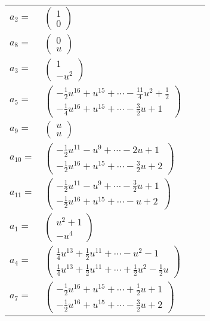 \documentclass[1p]{elsarticle_modified}
\theoremstyle{definition}
\begin{document}
\begin{tabular}{m{7pt} m{180pt} m{7pt} m{180pt} }
\flushright $a_{2}=$&$\begin{pmatrix}1\\0\end{pmatrix}$ \\
\flushright $a_{8}=$&$\begin{pmatrix}0\\u\end{pmatrix}$ \\
\flushright $a_{3}=$&$\begin{pmatrix}1\\- u^2\end{pmatrix}$ \\
\flushright $a_{5}=$&$\begin{pmatrix}-\frac{1}{2} u^{16}+u^{15}+\cdots-\frac{11}{4} u^2+\frac{1}{2}\\-\frac{1}{4} u^{16}+u^{15}+\cdots-\frac{3}{2} u+1\end{pmatrix}$ \\
\flushright $a_{9}=$&$\begin{pmatrix}u\\u\end{pmatrix}$ \\
\flushright $a_{10}=$&$\begin{pmatrix}-\frac{1}{2} u^{11}- u^9+\cdots-2 u+1\\-\frac{1}{2} u^{16}+u^{15}+\cdots-\frac{3}{2} u+2\end{pmatrix}$ \\
\flushright $a_{11}=$&$\begin{pmatrix}-\frac{1}{2} u^{11}- u^9+\cdots-\frac{3}{2} u+1\\-\frac{1}{2} u^{16}+u^{15}+\cdots- u+2\end{pmatrix}$ \\
\flushright $a_{1}=$&$\begin{pmatrix}u^2+1\\- u^4\end{pmatrix}$ \\
\flushright $a_{4}=$&$\begin{pmatrix}\frac{1}{4} u^{13}+\frac{1}{2} u^{11}+\cdots- u^2-1\\\frac{1}{4} u^{13}+\frac{1}{2} u^{11}+\cdots+\frac{1}{2} u^2-\frac{1}{2} u\end{pmatrix}$ \\
\flushright $a_{7}=$&$\begin{pmatrix}-\frac{1}{2} u^{16}+u^{15}+\cdots+\frac{1}{2} u+1\\-\frac{1}{2} u^{16}+u^{15}+\cdots-\frac{3}{2} u+2\end{pmatrix}$ \\

\end{tabular}
\end{document}
